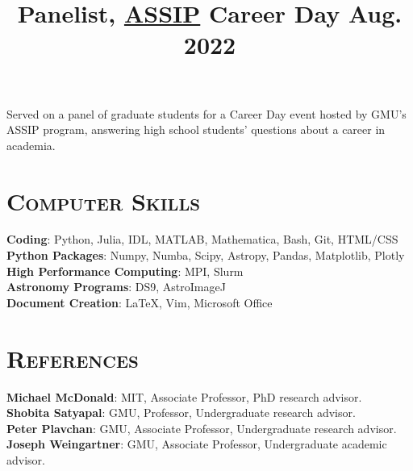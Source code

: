\documentclass[marg, centered]{res}
\begin{document}
\begin{resume}
\vspace{-0.2cm}
\title{\textbf{Panelist}, \href{https://science.gmu.edu/assip}{\color{dkbu} ASSIP} Career Day \hfill \textbf{Aug. 2022}}
\begin{position}
{\small Served on a panel of graduate students for a Career Day event hosted by GMU's ASSIP program, answering high school students' questions about a career in academia.}
\end{position}


\section{\scshape \bfseries Computer Skills}

\textbf{Coding}{: Python, Julia, IDL, MATLAB, Mathematica, Bash, Git, HTML/CSS} \\ 
\textbf{Python Packages}{: Numpy, Numba, Scipy, Astropy, Pandas, Matplotlib, Plotly} \\
\textbf{High Performance Computing}{: MPI, Slurm} \\
\textbf{Astronomy Programs}{: DS9, AstroImageJ} \\
\textbf{Document Creation}{: \LaTeX, Vim, Microsoft Office} \\


\section{{\scshape \bfseries References}}
\textbf{Michael McDonald}{: MIT, Associate Professor, PhD research advisor.}\\
\textbf{Shobita Satyapal}{: GMU, Professor, Undergraduate research advisor.}\\
\textbf{Peter Plavchan}{: GMU, Associate Professor, Undergraduate research advisor.}\\
\textbf{Joseph Weingartner}{: GMU,  Associate Professor, Undergraduate academic advisor.}\\

\end{resume}
\end{document}
